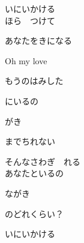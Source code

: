 {いにいかける
\\

ほら　つけて

あなたをきになる

Oh my love

もうのはみした

にいるの

がき

までちれない

そんなさわぎ　れる
\\

あなたといるの

ながき

のどれくらい？

いにいかける

}